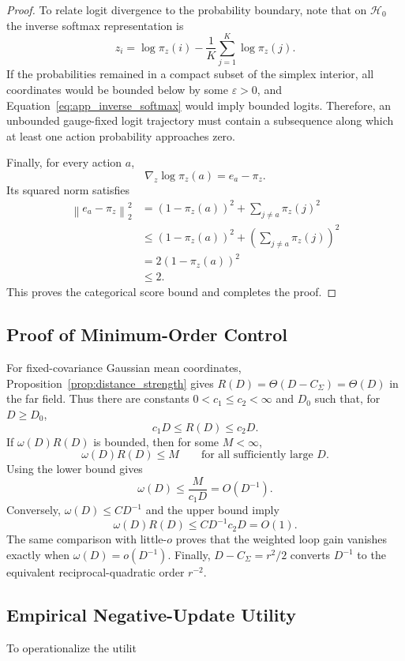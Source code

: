 \begin{proof}
To relate logit divergence to the probability boundary, note that on
$\mathcal{H}_0$ the inverse softmax representation is
\begin{equation}
    z_i
    =
    \log\pi_z(i)
    -
    \frac{1}{K}
    \sum_{j=1}^{K}
    \log\pi_z(j).
    \label{eq:app_inverse_softmax}
\end{equation}
If the probabilities remained in a compact subset of the simplex
interior, all coordinates would be bounded below by some
$\varepsilon>0$, and
Equation~\eqref{eq:app_inverse_softmax} would imply bounded logits.
Therefore, an unbounded gauge-fixed logit trajectory must contain a
subsequence along which at least one action probability approaches zero.

Finally, for every action $a$,
\begin{equation}
    \nabla_z\log\pi_z(a)
    =
    e_a-\pi_z.
\end{equation}
Its squared norm satisfies
\begin{equation}
\begin{aligned}
    \left\|
        e_a-\pi_z
    \right\|_2^2
    &=
    \left(
        1-\pi_z(a)
    \right)^2
    +
    \sum_{j\neq a}
    \pi_z(j)^2 \\
    &\leq
    \left(
        1-\pi_z(a)
    \right)^2
    +
    \left(
        \sum_{j\neq a}
        \pi_z(j)
    \right)^2 \\
    &=
    2
    \left(
        1-\pi_z(a)
    \right)^2 \\
    &\leq
    2.
\end{aligned}
\end{equation}
This proves the categorical score bound and completes the proof.
\end{proof}

\subsection{Proof of Minimum-Order Control}
\label{app:min_order_control}

For fixed-covariance Gaussian mean coordinates,
Proposition~\ref{prop:distance_strength} gives
\(R(D)=\Theta(D-C_\Sigma)=\Theta(D)\) in the far field. Thus there are
constants \(0<c_1\le c_2<\infty\) and \(D_0\) such that, for
\(D\ge D_0\),
\[
    c_1 D
    \le
    R(D)
    \le
    c_2 D .
\]
If \(\omega(D)R(D)\) is bounded, then for some \(M<\infty\),
\[
    \omega(D)R(D)\le M
    \qquad
    \text{for all sufficiently large } D .
\]
Using the lower bound gives
\[
    \omega(D)
    \le
    \frac{M}{c_1D}
    =
    O(D^{-1}).
\]
Conversely, \(\omega(D)\le CD^{-1}\) and the upper bound imply
\[
    \omega(D)R(D)
    \le
    CD^{-1}c_2D
    =
    O(1).
\]
The same comparison with little-\(o\) proves that the weighted loop gain
vanishes exactly when \(\omega(D)=o(D^{-1})\). Finally,
\(D-C_\Sigma=r^2/2\) converts \(D^{-1}\) to the equivalent
reciprocal-quadratic order \(r^{-2}\).


\subsection{Empirical Negative-Update Utility}
\label{app:negative_update_utility}

To operationalize the utilit